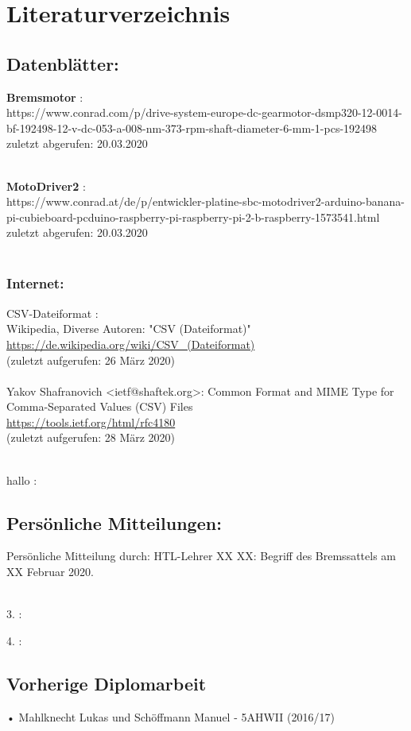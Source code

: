 \documentclass[12pt,a4paper]{article}
\begin{document}
\section{Literaturverzeichnis}
	\begin{description*}
{\footnotesize
\subsection*{Datenblätter:}
%
	\item[\bf Bremsmotor]:\\
		https://www.conrad.com/p/drive-system-europe-dc-gearmotor-dsmp320-12-0014-bf-192498-12-v-dc-053-a-008-nm-373-rpm-shaft-diameter-6-mm-1-pcs-192498\\
		zuletzt abgerufen: 20.03.2020\\\\
%
	\item[\bf MotoDriver2]:\\
		https://www.conrad.at/de/p/entwickler-platine-sbc-motodriver2-arduino-banana-pi-cubieboard-pcduino-raspberry-pi-raspberry-pi-2-b-raspberry-1573541.html\\
		zuletzt abgerufen: 20.03.2020\\\\
%
\subsubsection*{Internet:}
%
	\item[CSV-Dateiformat]:\\
	Wikipedia, Diverse Autoren: "CSV (Dateiformat)"\\
	\url{https://de.wikipedia.org/wiki/CSV\_(Dateiformat)}\\
	(zuletzt aufgerufen: 26 März 2020)\\\\
%
	Yakov Shafranovich <ietf@shaftek.org>: Common Format and MIME Type for Comma-Separated Values (CSV) Files\\
	\url{https://tools.ietf.org/html/rfc4180}\\
	(zuletzt aufgerufen: 28 März 2020)\\\\
%
	\item[hallo]:\\
%
\subsection*{Persönliche Mitteilungen:}
		Persönliche Mitteilung durch: HTL-Lehrer XX XX: Begriff des Bremssattels am XX Februar 2020. \\\\
%
	\item[3.]:
	\item[4.]:
	
\subsection*{Vorherige Diplomarbeit}
\item[•]Mahlknecht Lukas und Schöffmann Manuel - 5AHWII (2016/17)\\
}
\end{description*}
%
%
\newpage
\end{document}

